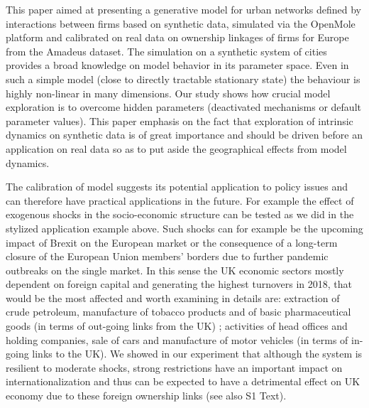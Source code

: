 \documentclass[10pt,letterpaper]{article}
\begin{document}
This paper aimed at presenting a generative model for urban networks defined by interactions between firms based on synthetic data, simulated via the OpenMole platform and calibrated on real data on ownership linkages of firms for Europe from the Amadeus dataset. The simulation on a synthetic system of cities provides a broad knowledge on model behavior in its parameter space. Even in such a simple model (close to directly tractable stationary state) the behaviour is highly non-linear in many dimensions. Our study shows how crucial model exploration is to overcome hidden parameters (deactivated mechanisms or default parameter values). This paper emphasis on the fact that exploration of intrinsic dynamics on synthetic data is of great importance and should be driven before an application on real data so as to put aside the geographical effects from model dynamics.

The calibration of model suggests its potential application to policy issues and can therefore have practical applications in the future. For example the effect of exogenous shocks in the socio-economic structure can be tested as we did in the stylized application example above. Such shocks can for example be the upcoming impact of Brexit on the European market or the consequence of a long-term closure of the European Union members' borders due to further pandemic outbreaks on the single market. In this sense the UK economic sectors mostly dependent on foreign capital and generating the highest turnovers in 2018, that would be the most affected and worth examining in details are: extraction of crude petroleum, manufacture of tobacco products and of basic pharmaceutical goods (in terms of out-going links from the UK) ; activities of head offices and holding companies, sale of cars and manufacture of motor vehicles (in terms of in-going links to the UK). We showed in our experiment that although the system is resilient to moderate shocks, strong restrictions have an important impact on internationalization and thus can be expected to have a detrimental effect on UK economy due to these foreign ownership links (see also S1 Text). %
\end{document}
